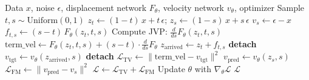 \begin{algorithm}[t]
\caption{Terminal Velocity Matching (TVM) Training}
\label{alg:terminal_velocity}
\begin{algorithmic}[1]
\Require Data $x$, noise $\epsilon$, displacement network $F_\theta$, velocity network $v_\theta$, optimizer
\State Sample $t, s \sim \text{Uniform}(0,1)$
\State $z_t \gets (1 - t) \, x + t \, \epsilon$; \quad $z_s \gets (1 - s) \, x + s \, \epsilon$
\State $v_s \gets \epsilon - x$ 
\State $f_{t,s} \gets (s - t) \, F_\theta(z_t, t, s)$ 
\State Compute JVP: $\frac{d}{ds} F_\theta(z_t, t, s)$
\State $\text{term\_vel} \gets F_\theta(z_t, t, s) + (s - t) \cdot \frac{d}{ds} F_\theta$ 
\State $z_{\text{arrived}} \gets z_t + f_{t,s}$ \textbf{detach}
\State $v_{\text{tgt}} \gets v_\theta(z_{\text{arrived}}, s)$ \textbf{detach}
\State $\mathcal{L}_{\text{TV}} \gets \| \text{term\_vel} - v_{\text{tgt}} \|^2$ 
\State $v_{\text{pred}} \gets v_\theta(z_s, s)$
\State $\mathcal{L}_{\text{FM}} \gets \| v_{\text{pred}} - v_s \|^2$ 
\State $\mathcal{L} \gets \mathcal{L}_{\text{TV}} + \mathcal{L}_{\text{FM}}$
\State Update $\theta$ with $\nabla_\theta \mathcal{L}$
\State \Return $\mathcal{L}$
\end{algorithmic}
\end{algorithm}
